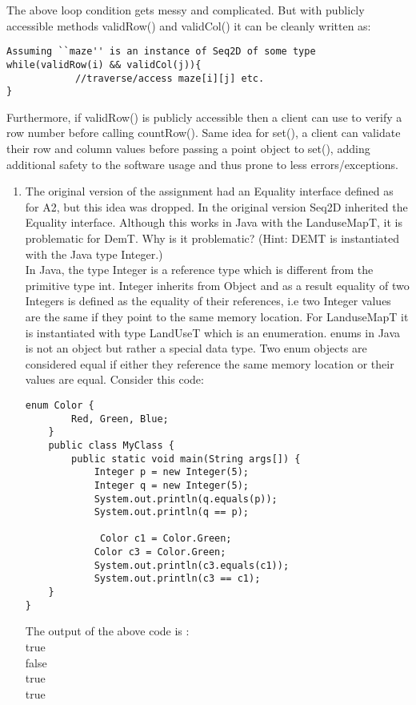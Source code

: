 \documentclass[12pt]{article}
\begin{document}
The above loop condition gets messy and complicated. But with publicly accessible methods validRow() and validCol() it can be cleanly written as:\\
\begin{verbatim}
Assuming ``maze'' is an instance of Seq2D of some type
while(validRow(i) && validCol(j)){
			//traverse/access maze[i][j] etc.
}
\end{verbatim}

Furthermore, if validRow() is publicly accessible then a client can use to verify a row number before calling countRow(). Same idea for set(), a client can validate their row and column values before passing a point object to set(), adding additional safety to the software usage and thus prone to less errors/exceptions.


\begin{enumerate}
\item The original version of the assignment had an Equality interface defined
  as for A2, but this idea was dropped.  In the original version Seq2D inherited
  the Equality interface.  Although this works in Java with the LanduseMapT, it is
  problematic for DemT.  Why is it problematic?  (Hint: DEMT is instantiated
  with the Java type Integer.)\\
  
  In Java, the type Integer is a reference type which is different from the primitive type int. Integer inherits from Object and as a result equality of two Integers is defined as the equality of their references, i.e two Integer values are the same if they point to the same memory location. For LanduseMapT it is instantiated with type LandUseT which is an enumeration. enums in Java is not an object but rather a special data type. Two enum objects are considered equal if either they reference the same memory location or their values are equal. Consider this code:
  \begin{verbatim}
enum Color {
    	Red, Green, Blue;
	}
	public class MyClass {
    	public static void main(String args[]) {
      		Integer p = new Integer(5);
      		Integer q = new Integer(5);
      		System.out.println(q.equals(p));
      		System.out.println(q == p);
      
     		 Color c1 = Color.Green;
      		Color c3 = Color.Green;
      		System.out.println(c3.equals(c1));
      		System.out.println(c3 == c1);
    }
}
\end{verbatim}

The output of the above code is :\\
true\\
false\\
true\\
true\\


\end{enumerate}
\end{document}
